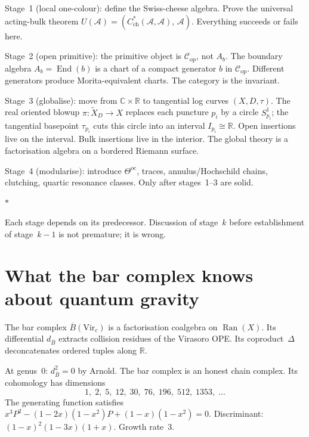 \documentclass[11pt]{article}
\newcommand{\cA}{\mathcal{A}}
\newcommand{\cC}{\mathcal{C}}
\newcommand{\barB}{\overline{B}}
\newcommand{\C}{\mathbb{C}}
\newcommand{\R}{\mathbb{R}}
\newcommand{\Ran}{\operatorname{Ran}}
\newcommand{\End}{\operatorname{End}}
\newcommand{\sep}{\bigskip\begin{center}$*$\end{center}\medskip}
\begin{document}
Stage~1 (local one-colour): define the Swiss-cheese algebra.
Prove the universal acting-bulk theorem
$U(\cA) = (C^*_{\mathrm{ch}}(\cA,\cA),\, \cA)$.
Everything succeeds or fails here.

\medskip

Stage~2 (open primitive): the primitive object is
$\cC_{\mathrm{op}}$, not $A_b$.  The boundary algebra
$A_b = \End(b)$ is a chart of a compact generator $b$ in
$\cC_{\mathrm{op}}$.  Different generators produce
Morita-equivalent charts.  The category is the invariant.

\medskip

Stage~3 (globalise): move from $\C \times \R$ to tangential log
curves $(X, D, \tau)$.  The real oriented blowup
$\pi\colon \widetilde{X}_D \to X$ replaces each puncture $p_i$ by
a circle $S^1_{p_i}$; the tangential basepoint $\tau_{p_i}$ cuts
this circle into an interval $I_{p_i} \cong \R$.  Open insertions
live on the interval.  Bulk insertions live in the interior.  The
global theory is a factorisation algebra on a bordered Riemann
surface.

\medskip

Stage~4 (modularise): introduce $\Theta^{\mathrm{oc}}$, traces,
annulus/Hochschild chains, clutching, quartic resonance classes.
Only after stages~1--3 are solid.

\sep

Each stage depends on its predecessor.  Discussion of stage~$k$
before establishment of stage~$k-1$ is not premature; it is wrong.


\section{What the bar complex knows about quantum gravity}
\label{sec:bar-knows-gravity}

The bar complex $\barB(\mathrm{Vir}_c)$ is a factorisation
coalgebra on $\Ran(X)$.  Its differential $d_{\barB}$ extracts
collision residues of the Virasoro OPE.  Its coproduct~$\Delta$
deconcatenates ordered tuples along $\R$.

At genus~$0$: $d_{\barB}^2 = 0$ by Arnold.  The bar complex is
an honest chain complex.  Its cohomology has dimensions
\[
1,\; 2,\; 5,\; 12,\; 30,\; 76,\; 196,\; 512,\; 1353,\; \ldots
\]
The generating function satisfies
$x^3 P^2 - (1-2x)(1-x^2)P + (1-x)(1-x^2) = 0$.
Discriminant: $(1-x)^2(1-3x)(1+x)$.  Growth rate~$3$.
\end{document}
